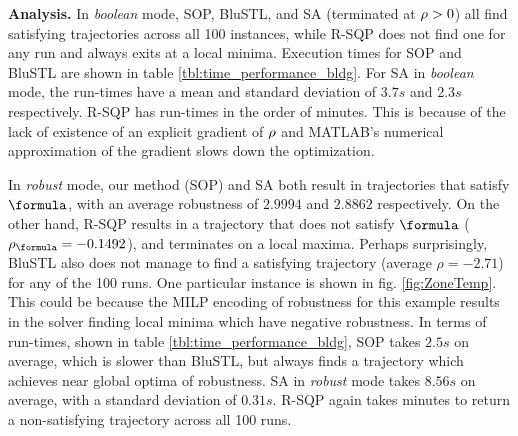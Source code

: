 \textbf{Analysis.} In \textit{boolean} mode, SOP, BluSTL, and SA (terminated at $\rho>0$) all find satisfying trajectories across all 100 instances, while R-SQP does not find one for any run and always exits at a local minima. Execution times for SOP and BluSTL are shown in table \ref{tbl:time_performance_bldg}. For SA in \textit{boolean} mode, the run-times have a mean and standard deviation of $3.7s$ and $2.3s$ respectively. R-SQP has run-times in the order of minutes. This is because of the lack of existence of an explicit gradient of $\rho$ and MATLAB's numerical approximation of the gradient slows down the optimization.


In \textit{robust} mode, our method (SOP) and SA both result in trajectories that satisfy $\formula$, with an average robustness of $2.9994$ and $2.8862$ respectively. On the other hand, R-SQP results in a trajectory that does not satisfy $\formula$ ($\rob_{\formula} = -0.1492$), and terminates on a local maxima. Perhaps surprisingly, BluSTL also does not manage to find a satisfying trajectory (average $\rho=-2.71$) for any of the 100 runs. One particular instance is shown in fig. \ref{fig:ZoneTemp}. This could be because the MILP encoding of robustness for this example results in the solver finding local minima which have negative robustness. In terms of run-times, shown in table \ref{tbl:time_performance_bldg}, SOP takes $2.5s$ on average, which is slower than BluSTL, but always finds a trajectory which achieves near global optima of robustness. SA in \textit{robust} mode takes $8.56s$ on average, with a standard deviation of $0.31s$. R-SQP again takes minutes to return a non-satisfying trajectory across all 100 runs. 



